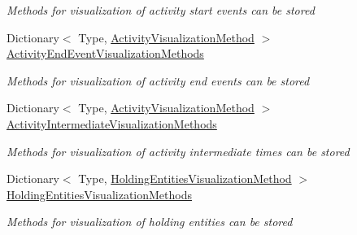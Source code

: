\begin{DoxyCompactItemize}
\begin{DoxyCompactList}\small\item\em Methods for visualization of activity start events can be stored \end{DoxyCompactList}\item 
Dictionary$<$ Type, \hyperlink{class_simulation_w_p_f_visualization_tools_1_1_base_w_p_f_control_unit_visualization_engine_a439b942d3344f348d72a0c88a98df938}{Activity\+Visualization\+Method} $>$ \hyperlink{class_simulation_w_p_f_visualization_tools_1_1_base_w_p_f_control_unit_visualization_engine_a9b7d65805c8283c661e2a2676ef5bf83}{Activity\+End\+Event\+Visualization\+Methods}
\begin{DoxyCompactList}\small\item\em Methods for visualization of activity end events can be stored \end{DoxyCompactList}\item 
Dictionary$<$ Type, \hyperlink{class_simulation_w_p_f_visualization_tools_1_1_base_w_p_f_control_unit_visualization_engine_a439b942d3344f348d72a0c88a98df938}{Activity\+Visualization\+Method} $>$ \hyperlink{class_simulation_w_p_f_visualization_tools_1_1_base_w_p_f_control_unit_visualization_engine_ab1e8a2f15a0b29f57e5b7d1ec4881bcc}{Activity\+Intermediate\+Visualization\+Methods}
\begin{DoxyCompactList}\small\item\em Methods for visualization of activity intermediate times can be stored \end{DoxyCompactList}\item 
Dictionary$<$ Type, \hyperlink{class_simulation_w_p_f_visualization_tools_1_1_base_w_p_f_control_unit_visualization_engine_a62619404394d1a38091b75e40b25af26}{Holding\+Entities\+Visualization\+Method} $>$ \hyperlink{class_simulation_w_p_f_visualization_tools_1_1_base_w_p_f_control_unit_visualization_engine_a247673914ce8f3f88f5f578ab76390bd}{Holding\+Entities\+Visualization\+Methods}
\begin{DoxyCompactList}\small\item\em Methods for visualization of holding entities can be stored \end{DoxyCompactList}\end{DoxyCompactItemize}


